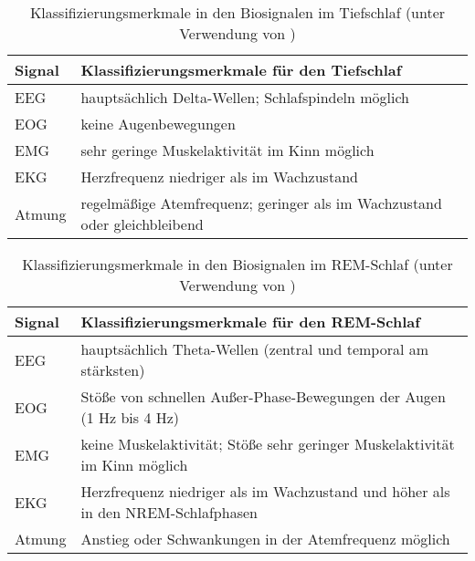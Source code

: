 \begin{table}[h]
\begin{small}
\centering
\begin{tabular}{|l|p{13cm}|}
\hline
\textbf{Signal} & \textbf{Klassifizierungsmerkmale für den Tiefschlaf} \\
\hline
\acs{EEG} & hauptsächlich Delta-Wellen; Schlafspindeln möglich\\
\hline
\acs{EOG} & keine Augenbewegungen\\
\hline
\acs{EMG} & sehr geringe Muskelaktivität im Kinn möglich\\
\hline
\acs{EKG} & Herzfrequenz niedriger als im Wachzustand\\
\hline
Atmung & regelmäßige Atemfrequenz; geringer als im Wachzustand oder gleichbleibend\\
\hline
\end{tabular}
\caption[Klassifizierungsmerkmale im Tiefschlaf]{Klassifizierungsmerkmale in den Biosignalen im Tiefschlaf (unter Verwendung von \parencite{lee-chiong_sleep_2008, steinberg_schlafmedizin_2010, rasche_update_2003, ebner_eeg_2006})}
\label{tab:tiefschlaf}
\end{small}
\end{table}

\begin{table}[H]
\begin{small}
\centering
\begin{tabular}{|l|p{13cm}|}
\hline
\textbf{Signal} & \textbf{Klassifizierungsmerkmale für den \acs{REM}-Schlaf} \\
\hline
\acs{EEG} & hauptsächlich Theta-Wellen (zentral und temporal am stärksten)\\
\hline
\acs{EOG} & Stöße von schnellen Außer-Phase-Bewegungen der Augen (1 Hz bis 4 Hz)\\
\hline
\acs{EMG} & keine Muskelaktivität; Stöße sehr geringer Muskelaktivität im Kinn möglich\\
\hline
\acs{EKG} & Herzfrequenz niedriger als im Wachzustand und höher als in den \acs{NREM}-Schlafphasen\\
\hline
Atmung & Anstieg oder Schwankungen in der Atemfrequenz möglich\\
\hline
\end{tabular}
\caption[Klassifizierungsmerkmale im \acs{REM}-Schlaf]{Klassifizierungsmerkmale in den Biosignalen im \acs{REM}-Schlaf (unter Verwendung von \parencite{lee-chiong_sleep_2008, steinberg_schlafmedizin_2010, rasche_update_2003, ebner_eeg_2006})}
\label{tab:rem}
\end{small}
\end{table}

